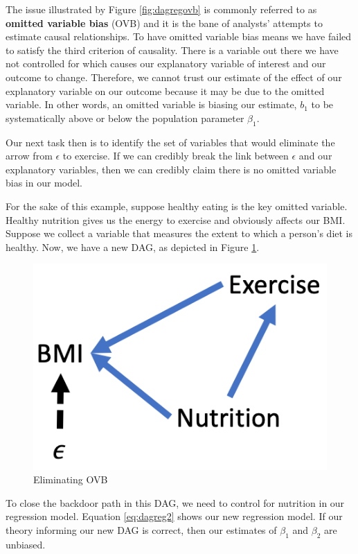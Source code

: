 \documentclass[
]{book}
\begin{document}
The issue illustrated by Figure \ref{fig:dagregovb} is commonly referred to as \textbf{omitted variable bias} (OVB) and it is the bane of analysts' attempts to estimate causal relationships. To have omitted variable bias means we have failed to satisfy the third criterion of causality. There is a variable out there we have not controlled for which causes our explanatory variable of interest and our outcome to change. Therefore, we cannot trust our estimate of the effect of our explanatory variable on our outcome because it may be due to the omitted variable. In other words, an omitted variable is biasing our estimate, \(b_1\) to be systematically above or below the population parameter \(\beta_1\).

Our next task then is to identify the set of variables that would eliminate the arrow from \(\epsilon\) to exercise. If we can credibly break the link between \(\epsilon\) and our explanatory variables, then we can credibly claim there is no omitted variable bias in our model.

For the sake of this example, suppose healthy eating is the key omitted variable. Healthy nutrition gives us the energy to exercise and obviously affects our BMI. Suppose we collect a variable that measures the extent to which a person's diet is healthy. Now, we have a new DAG, as depicted in Figure \ref{fig:dagregnut}.

\begin{figure}
\includegraphics[width=6.42in]{images/dag_regnut} \caption{Eliminating OVB}\label{fig:dagregnut}
\end{figure}

To close the backdoor path in this DAG, we need to control for nutrition in our regression model. Equation \eqref{eq:dagreg2} shows our new regression model. If our theory informing our new DAG is correct, then our estimates of \(\beta_1\) and \(\beta_2\) are unbiased.
\end{document}
